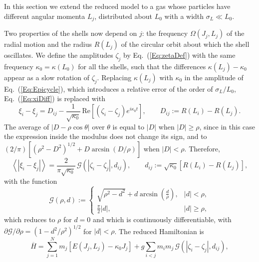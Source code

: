 \documentclass[prd,aps,nofootinbib,superscriptaddress,amsmath,amssymb]{revtex4}
\newcommand{\re}{\mbox{Re}}
\begin{document}
In this section we extend the reduced model to a gas whose particles have different angular momenta $L_j$, distributed about $L_0$ with a width $\sigma_L\ll L_0$.

Two properties of the shells now depend on $j$: the frequency $\Omega(J_j,L_j)$ of the radial motion and the radius $R(L_j)$ of the circular orbit about which the shell oscillates. We define the amplitudes $\zeta_j$ by Eq.~(\ref{Eq:zetaDef}) with the same frequency $\kappa_0 = \kappa(L_0)$ for all the shells, such that the differences $\kappa(L_j) - \kappa_0$ appear as a slow rotation of $\zeta_j$. Replacing $\kappa(L_j)$ with $\kappa_0$ in the amplitude of Eq.~(\ref{Eq:Epicycle}), which introduces a relative error of the order of $\sigma_L/L_0$, Eq.~(\ref{Eq:xiDiff}) is replaced with
\begin{equation}
\xi_i - \xi_j = D_{ij} - \frac{1}{\sqrt{\kappa_0}}\,\re\left[ \left( \zeta_i - \zeta_j \right) e^{i\kappa_0 t} \right],\qquad
D_{ij} := R(L_i) - R(L_j).
\label{Eq:xiDiffL}
\end{equation}
The average of $|D - \rho\cos\theta|$ over $\theta$ is equal to $|D|$ when $|D|\geq\rho$, since in this case the expression inside the modulus does not change its sign, and to $(2/\pi)[(\rho^2 - D^2)^{1/2} + D\arcsin(D/\rho)]$ when $|D| < \rho$. Therefore,
\begin{equation}
\left\langle \left| \xi_i - \xi_j \right| \right\rangle = \frac{2}{\pi\sqrt{\kappa_0}}\,\mathcal{G}\left( |\zeta_i - \zeta_j|,d_{ij} \right),\qquad
d_{ij} := \sqrt{\kappa_0}\left[ R(L_i) - R(L_j) \right],
\label{Eq:AverageL}
\end{equation}
with the function
\begin{equation}
\mathcal{G}(\rho,d) := \left\{ \begin{array}{ll}
\sqrt{\rho^2 - d^2} + d\arcsin\left( \displaystyle\frac{d}{\rho} \right), & |d| < \rho,\\
\displaystyle\frac{\pi}{2}|d|, & |d|\geq\rho,
\end{array} \right.
\label{Eq:Kernel}
\end{equation}
which reduces to $\rho$ for $d = 0$ and which is continuously differentiable, with $\partial\mathcal{G}/\partial\rho = (1 - d^2/\rho^2)^{1/2}$ for $|d| < \rho$. The reduced Hamiltonian is
\begin{equation}
\overline{H} = \sum\limits_{j=1}^N m_j\left[ E(J_j,L_j) - \kappa_0 J_j \right] + g\sum\limits_{i<j} m_i m_j\,\mathcal{G}\left( |\zeta_i - \zeta_j|,d_{ij} \right),
\label{Eq:HredL}
\end{equation}
\end{document}

